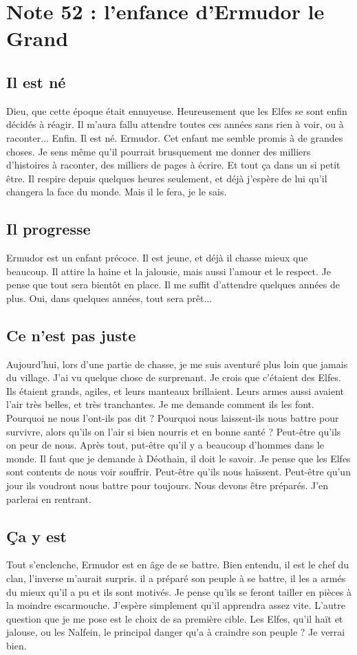 \section{Note 52 : l'enfance d'Ermudor le Grand}
\subsection{Il est né}
Dieu, que cette époque était ennuyeuse. Heureusement que les Elfes se sont enfin décidés à réagir. Il m'aura fallu attendre toutes ces années sans rien à voir, ou à raconter... Enfin. Il est né. Ermudor. Cet enfant me semble promis à de grandes choses. Je sens même qu'il pourrait brusquement me donner des milliers d'histoires à raconter, des milliers de pages à écrire. Et tout ça dans un si petit être. Il respire depuis quelques heures seulement, et déjà j'espère de lui qu'il changera la face du monde. Mais il le fera, je le sais.

\subsection{Il progresse}
Ermudor est un enfant précoce. Il est jeune, et déjà il chasse mieux que beaucoup. Il attire la haine et la jalousie, mais aussi l'amour et le respect. Je pense que tout sera bientôt en place. Il me suffit d'attendre quelques années de plus. Oui, dans quelques années, tout sera prêt...

\subsection{Ce n'est pas juste}
Aujourd'hui, lors d'une partie de chasse, je me suis aventuré plus loin que jamais du village. J'ai vu quelque chose de surprenant. Je crois que c'étaient des Elfes. Ils étaient grands, agiles, et leurs manteaux brillaient. Leurs armes aussi avaient l'air très belles, et très tranchantes. Je me demande comment ils les font. Pourquoi ne nous l'ont-ils pas dit ? Pourquoi nous laissent-ils nous battre pour survivre, alors qu'ils on l'air si bien nourris et en bonne santé ? Peut-être qu'ils on peur de nous. Après tout, put-être qu'il y a beaucoup d'hommes dans le monde. Il faut que je demande à Déothain, il doit le savoir. Je pense que les Elfes sont contents de nous voir souffrir. Peut-être qu'ils nous haïssent. Peut-être qu'un jour ils voudront nous battre pour toujours. Nous devons être préparés. J'en parlerai en rentrant.

\subsection{Ça y est}
Tout s'enclenche, Ermudor est en âge de se battre. Bien entendu, il est le chef du clan, l'inverse m'aurait surpris. il a préparé son peuple à se battre, il les a armés du mieux qu'il a pu et ils sont motivés. Je pense qu'ils se feront tailler en pièces à la moindre escarmouche. J'espère simplement qu'il apprendra assez vite. L'autre question que je me pose est le choix de sa première cible. Les Elfes, qu'il haït et jalouse, ou les Nalfein, le principal danger qu'a à craindre son peuple ? Je verrai bien.